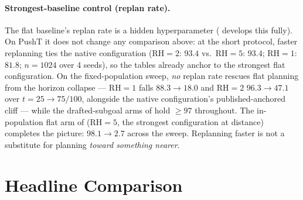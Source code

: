 \documentclass{article}
\begin{document}
\paragraph{Strongest-baseline control (replan rate).} The flat baseline's replan rate is
a hidden hyperparameter ( develops this fully). On PushT it does not
change any comparison above: at the short protocol, faster replanning ties the native
configuration (RH${=}2$: $93.4$ vs.\ RH${=}5$: $93.4$; RH${=}1$: $81.8$; $n{=}1024$
over 4 seeds), so the tables already anchor to the strongest flat configuration. On the
fixed-population sweep, \emph{no} replan rate rescues flat planning from the horizon
collapse --- RH${=}1$ falls $88.3\to18.0$ and RH${=}2$ $96.3\to47.1$ over
$t{=}25\to75/100$, alongside the native configuration's published-anchored cliff ---
while the drafted-subgoal arms of  hold ${\geq}97$ throughout.
The in-population flat arm of  (RH${=}5$, the strongest
configuration at distance) completes the picture: $98.1\to2.7$ across the sweep.
Replanning faster is not a substitute for planning \emph{toward something nearer}.

\section{Headline Comparison}
\label{sec:headline}
\end{document}
